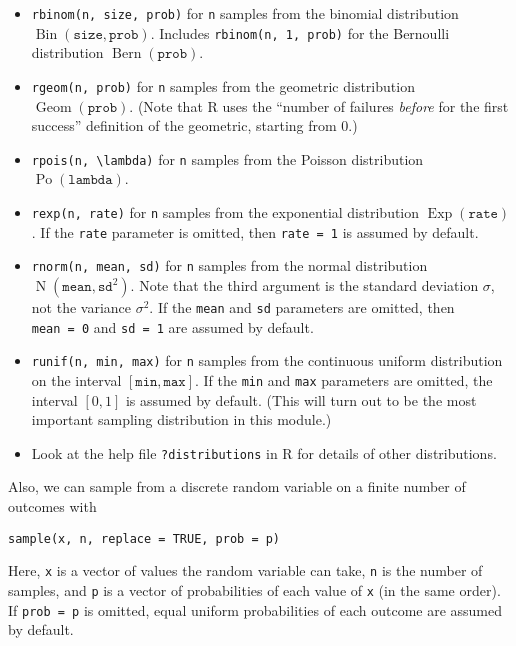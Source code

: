 \documentclass[
  letterpaper,
  DIV=11,
  numbers=noendperiod]{scrreprt}
\theoremstyle{definition}
\theoremstyle{definition}
\theoremstyle{remark}
\begin{document}
\begin{itemize}
\item
  \texttt{rbinom(n,\ size,\ prob)} for \texttt{n} samples from the
  binomial distribution
  \(\operatorname{Bin}(\mathtt{size}, \texttt{prob})\). Includes
  \texttt{rbinom(n,\ 1,\ prob)} for the Bernoulli distribution
  \(\operatorname{Bern}(\mathtt{prob})\).
\item
  \texttt{rgeom(n,\ prob)} for \texttt{n} samples from the geometric
  distribution \(\operatorname{Geom}(\mathtt{prob})\). (Note that R uses
  the ``number of failures \emph{before} for the first success''
  definition of the geometric, starting from 0.)
\item
  \texttt{rpois(n,\ \textbackslash{}lambda)} for \texttt{n} samples from
  the Poisson distribution \(\operatorname{Po}(\mathtt{lambda})\).
\item
  \texttt{rexp(n,\ rate)} for \texttt{n} samples from the exponential
  distribution \(\operatorname{Exp}(\mathtt{rate})\). If the
  \texttt{rate} parameter is omitted, then \texttt{rate\ =\ 1} is
  assumed by default.
\item
  \texttt{rnorm(n,\ mean,\ sd)} for \texttt{n} samples from the normal
  distribution \(\operatorname{N}(\mathtt{mean},\mathtt{sd}^2)\). Note
  that the third argument is the standard deviation \(\sigma\), not the
  variance \(\sigma^2\). If the \texttt{mean} and \texttt{sd} parameters
  are omitted, then \texttt{mean\ =\ 0} and \texttt{sd\ =\ 1} are
  assumed by default.
\item
  \texttt{runif(n,\ min,\ max)} for \texttt{n} samples from the
  continuous uniform distribution on the interval
  \([\mathtt{min}, \mathtt{max}]\). If the \texttt{min} and \texttt{max}
  parameters are omitted, the interval \([0,1]\) is assumed by default.
  (This will turn out to be the most important sampling distribution in
  this module.)
\item
  Look at the help file \texttt{?distributions} in R for details of
  other distributions.
\end{itemize}

Also, we can sample from a discrete random variable on a finite number
of outcomes with

\begin{verbatim}
sample(x, n, replace = TRUE, prob = p)
\end{verbatim}

Here, \texttt{x} is a vector of values the random variable can take,
\texttt{n} is the number of samples, and \texttt{p} is a vector of
probabilities of each value of \texttt{x} (in the same order). If
\texttt{prob\ =\ p} is omitted, equal uniform probabilities of each
outcome are assumed by default.
\end{document}
